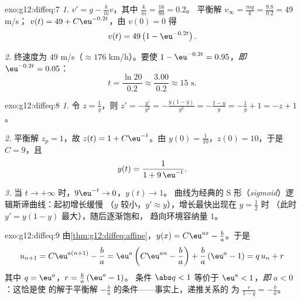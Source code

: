 \begin{solution}{exo:g12:diffeq:7}
\emph{1.} $v' = g - \frac{k}{m} v$，其中 $\frac km = \frac{16}{80} = 0.2$。
平衡解 $v_\infty = \frac{mg}{k} = \frac{9.8}{0.2} = 49$ m/s；
$v(t) = 49 + C\eu^{-0.2t}$，由 $v(0) = 0$ 得
\[
v(t) = 49\left(1 - \eu^{-0.2 t}\right).
\]

\emph{2.} 终速度为 $49$ m/s（$\approx 176$ km/h）。要使
$1 - \eu^{-0.2t} = 0.95$，\emph{即} $\eu^{-0.2t} = 0.05$：
\[
t = \frac{\ln 20}{0.2} \approx \frac{3.00}{0.2} \approx 15 \text{ s}.
\]
\end{solution}

\begin{solution}{exo:g12:diffeq:8}
\emph{1.} 令 $z = \frac1y$，则 $z' = -\frac{y'}{y^2}
= -\frac{y(1-y)}{y^2} = -\frac{1-y}{y} = -\frac1y + 1 = -z + 1$。

\emph{2.} 平衡解 $z_p = 1$，故 $z(t) = 1 + C\eu^{-t}$。由
$y(0) = \frac{1}{10}$，$z(0) = 10$，于是 $C = 9$，且
\[
y(t) = \frac{1}{1 + 9\,\eu^{-t}} .
\]

\emph{3.} 当 $t \to +\infty$ 时，$9\eu^{-t} \to 0$，$y(t) \to 1$。
曲线为经典的 S 形（\emph{sigmoid}）逻辑斯谛曲线：起初增长缓慢
（$y$ 较小，$y' \approx y$），增长最快出现在 $y = \frac12$ 时
（此时 $y' = y(1-y)$ 最大），随后逐渐饱和，
趋向环境容纳量 $1$。
\end{solution}

\begin{solution}{exo:g12:diffeq:9}
由\cref{thm:g12:diffeq:affine}，$y(x) = C\eu^{ax} - \frac ba$。于是
\[
u_{n+1} = C\eu^{a(n+1)} - \frac ba
= \eu^{a}\left(C\eu^{an} - \frac ba\right) + \frac ba\left(\eu^a - 1\right)
= q\,u_n + r
\]
其中 $q = \eu^{a}$，$r = \frac{b}{a}\left(\eu^{a} - 1\right)$。
条件 $\abs q < 1$ 等价于 $\eu^a < 1$，\emph{即} $a < 0$：这恰是使
的解于平衡解
$-\frac ba$ 的条件——事实上，递推关系的
为 $\frac{r}{1 - q} = -\frac{b}{a}$。
\end{solution}

